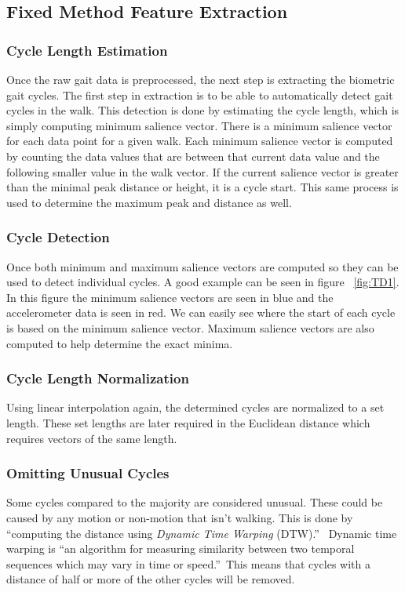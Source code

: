 \documentclass{sig-alternate}
\begin{document}
\subsection{Fixed Method Feature Extraction}

\subsubsection{Cycle Length Estimation}
Once the raw gait data is preprocessed, the next step is extracting the biometric gait cycles. The first step in extraction is to be able to automatically detect gait cycles in the walk. This detection is done by estimating the cycle length, which is simply computing minimum salience vector. There is a minimum salience vector for each data point for a given walk. Each minimum salience vector is computed by counting the data values that are between that current data value and the following smaller value in the walk vector. If the current salience vector is greater than the minimal peak distance or height, it is a cycle start. This same process is used to determine the maximum peak and distance as well.

\subsubsection{Cycle Detection}
Once both minimum and maximum salience vectors are computed so they can be used to detect individual cycles. A good example can be seen in figure ~\ref{fig:TD1}. In this figure the minimum salience vectors are seen in blue and the accelerometer data is seen in red. We can easily see where the start of each cycle is based on the minimum salience vector. Maximum salience vectors are also computed to help determine the exact minima.

\subsubsection{Cycle Length Normalization}
Using linear interpolation again, the determined cycles are normalized to a set length. These set lengths are later required in the Euclidean distance which requires vectors of the same length.

\subsubsection{Omitting Unusual Cycles}
Some cycles compared to the majority are considered unusual. These could be caused by any motion or non-motion that isn't walking. This is done by ``computing the distance using \textit{Dynamic Time Warping} (DTW).''~\cite{Muaaz:2013} Dynamic time warping is ``an algorithm for measuring similarity between two temporal sequences which may vary in time or speed.''~\cite{wiki2:2014}This means that cycles with a distance of half or more of the other cycles will be removed.
\end{document}
